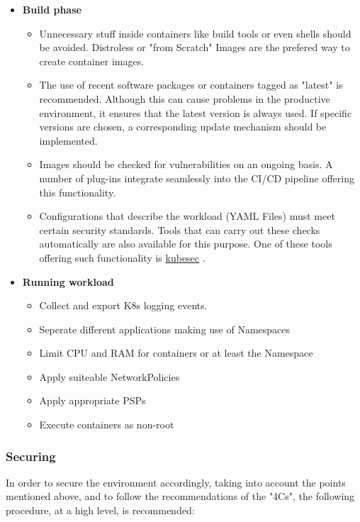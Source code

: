 \documentclass[MIC,Master,english]{twbook}%
\begin{document}
\begin{itemize}
    \label{item:secureworkload}
    \item \textbf{Build phase}
    \begin{itemize}
        \item Unnecessary stuff inside containers like build tools or even shells should be avoided. Distroless or "from Scratch" Images are the prefered way to create container images.
        \item The use of recent software packages or containers tagged as "latest" is recommended. Although this can cause problems in the productive environment, it ensures that the latest version is always used. If specific versions are chosen, a corresponding update mechanism should be implemented.
        \item Images should be checked for vulnerabilities on an ongoing basis. A number of plug-ins integrate seamlessly into the CI/CD pipeline offering this functionality.
        \item Configurations that describe the workload (YAML Files) must meet certain security standards. Tools that can carry out these checks automatically are also available for this purpose. One of these tools offering such functionality is \hyperref{https://kubesec.io/}{}{}{kubesec} \cite{kubesec}.
    \end{itemize}
    \item \textbf{Running workload}
    \begin{itemize}
        \item Collect and export \ac{K8s} logging events.
        \item Seperate different applications making use of Namespaces
        \item Limit \ac{CPU} and \ac{RAM} for containers or at least the Namespace
        \item Apply suiteable NetworkPolicies
        \item Apply appropriate \ac{PSP}s
        \item Execute containers as non-root
    \end{itemize}
\end{itemize}

\subsubsection{Securing}
In order to secure the environment accordingly, taking into account the points mentioned above, and to follow the recommendations of the "4Cs", the following procedure, at a high level, is recommended:
\end{document}
